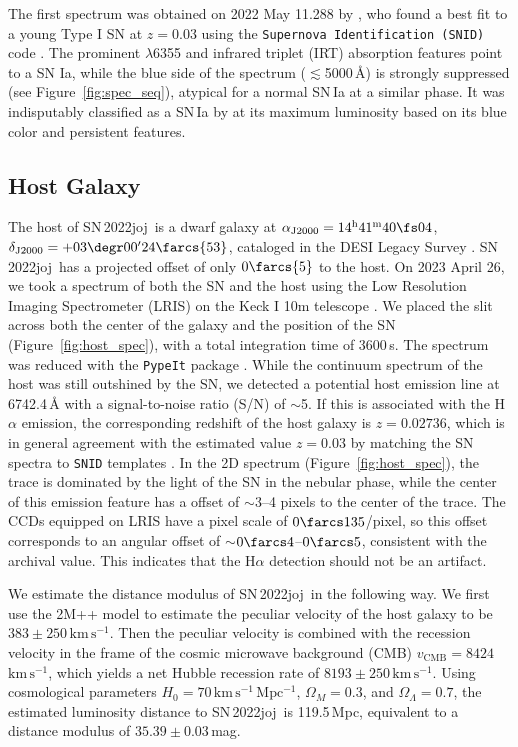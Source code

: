\documentclass[twocolumn]{aastex631}
\newcommand{\sn}{SN\,2022joj}
\newcommand{\kms}{$\mathrm{km}\,\mathrm{s}^{-1}$}
\begin{document}
\begin{CJK*}{UTF8}{gbsn}
The first spectrum was obtained on 2022 May 11.288 by \citet{Newsome_2022TNSCR}, who found a best fit to a young Type I SN at $z=0.03$ using the \texttt{Supernova Identification (SNID)} code \citep{Blondin_SNID_2007}. The prominent  $\lambda$6355 and  infrared triplet (IRT) absorption features point to a SN Ia, while the blue side of the spectrum ($\lesssim$5000\,\r{A}) is strongly suppressed (see Figure~\ref{fig:spec_seq}), atypical for a normal SN\,Ia at a similar phase. It was indisputably classified as a SN\,Ia by \citet{Chu_2022TNSCR} at its maximum luminosity based on its blue color and persistent  features.

\subsection{Host Galaxy}
The host of \sn\ is a dwarf galaxy at $\alpha_\mathrm{J2000}=14^\mathrm{h}41^\mathrm{m}40\fs04$, $\delta_\mathrm{J2000}=+03\degr00'24\farcs{53}$, cataloged in the DESI Legacy Survey \citep[LS;][]{Dey_LS_2019}. \sn\ has a projected offset of only $0\farcs{5}$ to the host. On 2023 April 26, we took a spectrum of both the SN and the host using the Low Resolution Imaging Spectrometer (LRIS) on the Keck I 10m telescope \citep{Keck_1995}. We placed the slit across both the center of the galaxy and the position of the SN (Figure~\ref{fig:host_spec}), with a total integration time of 3600\,s. The spectrum was reduced with the \texttt{PypeIt} package \citep{pypeit:joss_pub}. While the continuum spectrum of the host was still outshined by the SN, we detected a potential host emission line at 6742.4\,\r{A} with a signal-to-noise ratio (S/N) of $\sim$5. If this is associated with the H$\alpha$ emission, the corresponding redshift of the host galaxy is $z=0.02736$, which is in general agreement with the estimated value $z=0.03$ by matching the SN spectra to \texttt{SNID} templates \citep{Newsome_2022TNSCR}. In the 2D spectrum (Figure~\ref{fig:host_spec}), the trace is dominated by the light of the SN in the nebular phase, while the center of this emission feature has a offset of $\sim$3--4 pixels to the center of the trace. The CCDs equipped on LRIS have a pixel scale of $0\farcs135$/pixel, so this offset corresponds to an angular offset of $\sim$$0\farcs4$--$0\farcs5$, consistent with the archival value. This indicates that the H$\alpha$ detection should not be an artifact.

We estimate the distance modulus of \sn\ in the following way. We first use the 2M++ model \citep{Carrick2015_2M++} to estimate the peculiar velocity of the host galaxy to be $383\pm250$\,\kms. Then the peculiar velocity is combined with the recession velocity in the frame of the cosmic microwave background (CMB) $v_\mathrm{CMB}=8424$\,\kms, which yields a net Hubble recession rate of $8193\pm250$\,\kms. Using cosmological parameters $H_0 = 70\,\mathrm{km\,s^{-1}\,Mpc^{-1}}$, $\Omega_M=0.3$, and $\Omega_\Lambda=0.7$, the estimated luminosity distance to \sn\ is 119.5\,Mpc, equivalent to a distance modulus of $35.39\pm0.03$\,mag.


\end{CJK*}
\end{document}
